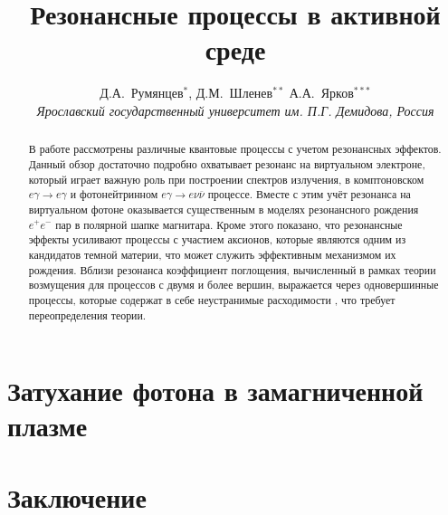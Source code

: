 \documentclass[12pt]{article}
\title{Резонансные процессы в активной среде}
\author{Д.А.~Румянцев$^{*}$, Д.М.~Шленев$^{**}$
А.А.~Ярков$^{***}$
\\
{\it Ярославский государственный университет им. П.Г. Демидова, Россия}}
\date{}
\begin{document}
\large
\maketitle
\def\abstractname{\empty}
\baselineskip=22pt

\begin{abstract}

\baselineskip=20pt

В работе рассмотрены различные квантовые процессы с учетом резонансных эффектов. Данный обзор достаточно подробно охватывает резонанс на виртуальном электроне, который играет важную роль при построении спектров излучения, в комптоновском $e\gamma \to e \gamma$ и фотонейтринном $e\gamma\to e \nu \overline{\nu}$ процессе. Вместе с этим учёт резонанса на виртуальном фотоне оказывается существенным в моделях резонансного  рождения $e^+e^-$ пар в полярной шапке магнитара. Кроме этого показано, что резонансные эффекты усиливают процессы с участием аксионов, которые являются одним из кандидатов темной материи, что может служить эффективным механизмом их рождения. Вблизи резонанса коэффициент поглощения, вычисленный в рамках теории возмущения для процессов с двумя и более вершин, выражается через одновершинные процессы, которые содержат в себе неустранимые расходимости , что требует переопределения теории.
\end{abstract}

{\def\thefootnote{*}
\def\thefootnote{**}
\def\thefootnote{***}
}

\newpage
\unitlength 1mm


\tableofcontents
\clearpage


\label{Ch:WaveF}
\label{Ch:Propagator}

\label{Ch:Compton}

%

\section{Затухание фотона в замагниченной плазме}\label{Ch:DampPhot}


\section{Заключение}

\newpage
%


\end{document}
